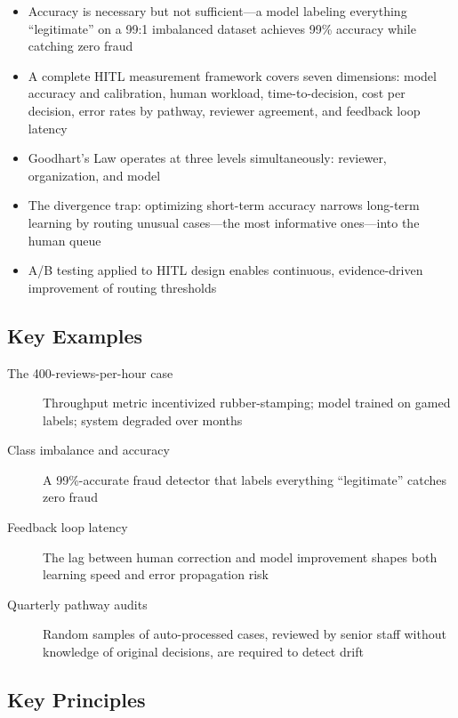 \begin{keyconcept}
\begin{itemize}
    \item Accuracy is necessary but not sufficient---a model labeling everything ``legitimate'' on a 99:1 imbalanced dataset achieves 99\% accuracy while catching zero fraud
    \item A complete HITL measurement framework covers seven dimensions: model accuracy and calibration, human workload, time-to-decision, cost per decision, error rates by pathway, reviewer agreement, and feedback loop latency
    \item Goodhart's Law operates at three levels simultaneously: reviewer, organization, and model
    \item The divergence trap: optimizing short-term accuracy narrows long-term learning by routing unusual cases---the most informative ones---into the human queue
    \item A/B testing applied to HITL design enables continuous, evidence-driven improvement of routing thresholds
\end{itemize}
\end{keyconcept}

\subsection*{Key Examples}

\begin{description}
    \item[The 400-reviews-per-hour case] Throughput metric incentivized rubber-stamping; model trained on gamed labels; system degraded over months
    \item[Class imbalance and accuracy] A 99\%-accurate fraud detector that labels everything ``legitimate'' catches zero fraud
    \item[Feedback loop latency] The lag between human correction and model improvement shapes both learning speed and error propagation risk
    \item[Quarterly pathway audits] Random samples of auto-processed cases, reviewed by senior staff without knowledge of original decisions, are required to detect drift
\end{description}

\subsection*{Key Principles}

